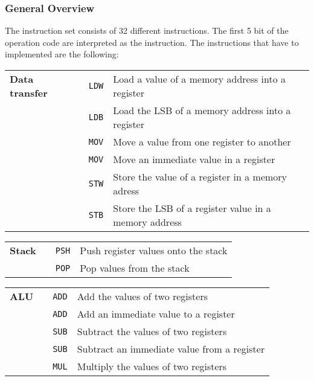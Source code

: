 \documentclass{report}
\newcounter{magicrownumbers}
\newcommand\rownumber{\stepcounter{magicrownumbers}\arabic{magicrownumbers}}
\begin{document}
\subsubsection*{General Overview}
The instruction set consists of 32 different instructions. The first 5 bit of the operation code are interpreted as the instruction. The instructions that have to implemented are the following:
\begin{table}[H]
	\centering
	\begin{longtable}{p{}p{}p{}p{}}
        \textbf{Data transfer} & \rownumber & \texttt{LDW} & Load a value of a memory address into a register\\
                               & \rownumber & \texttt{LDB} & Load the LSB of a memory address into a register\\
                               & \rownumber & \texttt{MOV} & Move a value from one register to another\\
                               & \rownumber & \texttt{MOV} & Move an immediate value in a register\\
                               & \rownumber & \texttt{STW} & Store the value of a register in a memory adress\\
                               & \rownumber & \texttt{STB} & Store the LSB of a register value in a memory address\\
	\end{longtable}
	\begin{longtable}{p{}p{}p{}p{}}
        \textbf{Stack} & \rownumber & \texttt{PSH} & Push register values onto the stack\\
                       & \rownumber & \texttt{POP} & Pop values from the stack\
	\end{longtable}
	\begin{longtable}{p{}p{}p{}p{}}
        \textbf{ALU} & \rownumber & \texttt{ADD} & Add the values of two registers\\
                     & \rownumber & \texttt{ADD} & Add an immediate value to a register\\
                     & \rownumber & \texttt{SUB} & Subtract the values of two registers\\
                     & \rownumber & \texttt{SUB} & Subtract an immediate value from a register\\
                     & \rownumber & \texttt{MUL} & Multiply the values of two registers\\

\end{longtable}
\end{table}
\end{document}

